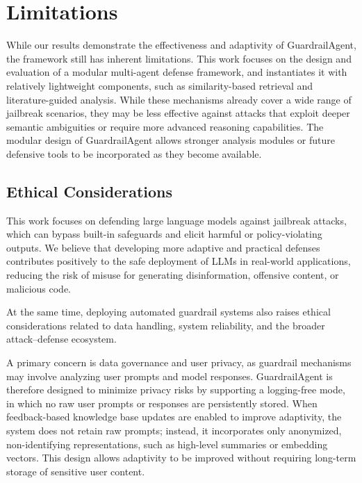 \documentclass[letterpaper,twocolumn,10pt]{article}
\newcommand{\agentname}{GuardrailAgent\xspace}
\begin{document}
\section*{Limitations}

While our results demonstrate the effectiveness and adaptivity of \agentname, the framework still has inherent limitations.
This work focuses on the design and evaluation of a modular multi-agent defense framework, and instantiates it with relatively lightweight components, such as similarity-based retrieval and literature-guided analysis.
While these mechanisms already cover a wide range of jailbreak scenarios, they may be less effective against attacks that exploit deeper semantic ambiguities or require more advanced reasoning capabilities.
The modular design of \agentname allows stronger analysis modules or future defensive tools to be incorporated as they become available.

\subsection*{Ethical Considerations}

This work focuses on defending large language models against jailbreak attacks, which can bypass built-in safeguards and elicit harmful or policy-violating outputs.
We believe that developing more adaptive and practical defenses contributes positively to the safe deployment of LLMs in real-world applications, reducing the risk of misuse for generating disinformation, offensive content, or malicious code.

At the same time, deploying automated guardrail systems also raises ethical considerations related to data handling, system reliability, and the broader attack–defense ecosystem.

A primary concern is data governance and user privacy, as guardrail mechanisms may involve analyzing user prompts and model responses. GuardrailAgent is therefore designed to minimize privacy risks by supporting a logging-free mode, in which no raw user prompts or responses are persistently stored. When feedback-based knowledge base updates are enabled to improve adaptivity, the system does not retain raw prompts; instead, it incorporates only anonymized, non-identifying representations, such as high-level summaries or embedding vectors. This design allows adaptivity to be improved without requiring long-term storage of sensitive user content.
\end{document}
